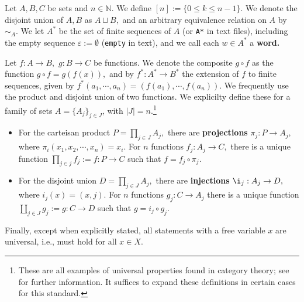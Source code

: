 Let $A, B, C$ be sets and $n \in \mathbb{N}$. We define $[n] := \{0 \leq k \leq n-1\}.$ We denote the disjoint union of $A, B$ as $A \sqcup B,$ and an arbitrary equivalence relation on $A$ by $\sim_{A}.$ We let
$A^{*}$ be the set of finite sequences of $A$ (or \texttt{A*} in text files), including the empty sequence $\varepsilon := \emptyset$ (\texttt{empty} in text), and we call each $w \in A^{*}$ a \textbf{word.}

Let $f: A \to B,$ $g: B \to C$ be functions. We denote the composite $g \circ f$ as the function $g \circ f = g(f(x)),$ and by $f^{*}: A^{*} \to B^{*}$ the extension of $f$ to finite sequences, given by $f^{*}(a_{1}, \cdots, a_{n}) = (f(a_{1}), \cdots, f(a_{n})).$ We frequently use the product and disjoint union of two functions. We explicilty define these for a family of sets $A = \{A_j\}_{j \in J}$, with $|J| = n.$\footnote{These are all examples of universal properties found in category theory; see \cite{maclane} for further information. It suffices to expand these definitions in certain cases for this standard.}
\begin{itemize}
\item For the carteisan product $P = \prod_{j \in J}A_{j},$ there are \textbf{projections} $\pi_j: P \to A_{j},$ where $\pi_i(x_{1}, x_{2}, \cdots, x_{n}) = x_{i}.$ For $n$ functions $f_{j}: A_{j} \to C,$ there is a unique function $\prod_{j \in j}f_{j} := f: P \to C$ such that $f = f_{j} \circ \pi_{j}.$
  \item For the disjoint union $D = \prod_{j \in J}A_{j},$ there are \textbf{injections} $\i_{j}: A_{j} \to D,$ where $i_{j}(x) = (x, j).$  For $n$ functions $g_j: C \to A_{j}$ there is a unique function $\coprod_{j \in J}g_{j} := g: C \to D$ such that
$g = i_{j} \circ g_{j}.$
\end{itemize}

Finally, except when explicitly stated, all statements with a free variable $x$ are universal, i.e., must hold for all $x \in X.$


